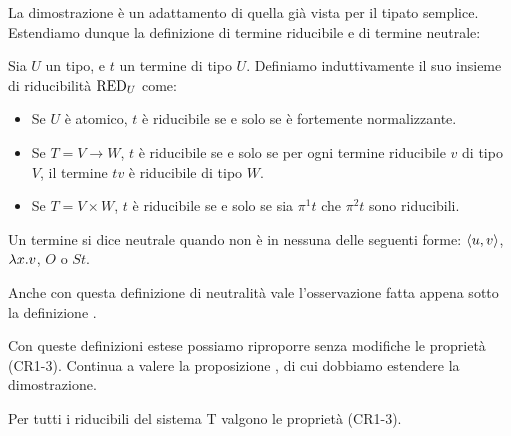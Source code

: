 \documentclass[]{marticle}
\begin{document}
La dimostrazione \`e un adattamento di quella gi\`a vista per il tipato
semplice. Estendiamo dunque la definizione di termine riducibile e di termine
neutrale:
\begin{block}[Definizione]
    Sia $U$ un tipo, e $t$ un termine di tipo $U$. Definiamo induttivamente il
    suo insieme di riducibilit\`a $\text{RED}_{U}$ come:
    \begin{itemize}
        \item Se $U$ \`e atomico, $t$ \`e riducibile se e solo se \`e fortemente
            normalizzante.
        \item Se $T = V \rightarrow W$, $t$ \`e riducibile se e solo se per ogni
            termine riducibile $v$ di tipo $V$, il termine $tv$ \`e riducibile
            di tipo $W$.
        \item Se $T = V \times W$, $t$ \`e riducibile se e solo se sia $\pi^1
            t$ che $\pi^2 t$ sono riducibili.
    \end{itemize}
\end{block}

\begin{block}[Definizione]
    Un termine si dice neutrale quando non \`e in nessuna delle seguenti forme:
    $\langle u,v \rangle$, $\lambda x. v$, $O$ o $S t$.
\end{block}

Anche con questa definizione di neutralit\`a vale l'osservazione fatta appena
sotto la definizione .

Con queste definizioni estese possiamo riproporre senza modifiche le propriet\`a
(CR1-3). Continua a valere la proposizione , di cui dobbiamo
estendere la dimostrazione.

\begin{block}[Proposizione]
    Per tutti i riducibili del sistema T valgono le propriet\`a (CR1-3).
\end{block}
\end{document}
